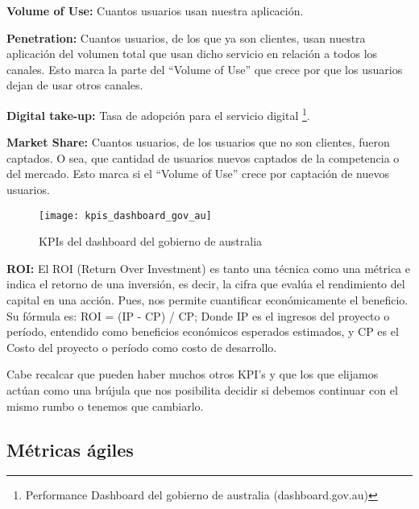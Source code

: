 \begin{description}
  \item {\textbf{Volume of Use:} Cuantos usuarios usan nuestra aplicación.
}
  \item {\textbf{Penetration:} Cuantos usuarios, de los que ya son clientes, usan nuestra aplicación del volumen total que usan dicho servicio en relación a todos los canales. Esto marca la parte del “Volume of Use” que crece por que los usuarios dejan de usar otros canales.
}

  \item {\textbf{Digital take-up:} Tasa de adopción para el servicio digital \footnote{Performance Dashboard del gobierno de australia (dashboard.gov.au)}.
}

  \item {\textbf{Market Share:} Cuantos usuarios, de los usuarios que no son clientes, fueron captados. O sea, que cantidad de usuarios nuevos captados de la competencia o del mercado. Esto marca si el “Volume of Use” crece por captación de nuevos usuarios.
}

  \begin{figure}[h]
  \centering
  \texttt{[image: kpis\_dashboard\_gov\_au]}
  \caption{KPIs del dashboard del gobierno de australia}
  \centering
  \label{fig:kpis_dashboard_gov_au} %
  \end{figure}
  \FloatBarrier

  \item {\textbf{ROI:} El ROI (Return Over Investment) es tanto una técnica como una métrica e indica el retorno de una inversión, es decir, la cifra que evalúa el rendimiento del capital en una acción. Pues, nos permite cuantificar económicamente el beneficio. Su fórmula es: ROI = (IP - CP) / CP; Donde IP es el ingresos del proyecto o período, entendido como beneficios económicos esperados estimados, y CP es el Costo del proyecto o período como costo de desarrollo.
}

\end{description}

Cabe recalcar que pueden haber muchos otros KPI's y que los que elijamos actúan como una brújula que nos posibilita decidir si debemos continuar con el mismo rumbo o tenemos que cambiarlo.

\subsection{Métricas ágiles}

